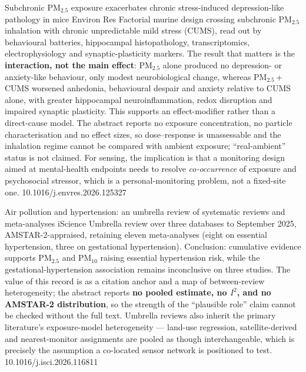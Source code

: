 \documentclass[10pt]{article}
\begin{document}
{Subchronic PM$_{2.5}$ exposure exacerbates chronic stress-induced depression-like pathology in mice}
{Environ Res}
{Factorial murine design crossing subchronic PM$_{2.5}$ inhalation with chronic
unpredictable mild stress (CUMS), read out by behavioural batteries, hippocampal
histopathology, transcriptomics, electrophysiology and synaptic-plasticity markers.
The result that matters is the \textbf{interaction, not the main effect}: PM$_{2.5}$
alone produced no depression- or anxiety-like behaviour, only modest neurobiological
change, whereas PM$_{2.5}$\,+\,CUMS worsened anhedonia, behavioural despair and anxiety
relative to CUMS alone, with greater hippocampal neuroinflammation, redox disruption and
impaired synaptic plasticity. This supports an effect-modifier rather than a direct-cause
model. The abstract reports no exposure concentration, no particle characterisation and no
effect sizes, so dose--response is unassessable and the inhalation regime cannot be
compared with ambient exposure; ``real-ambient'' status is not claimed. For sensing, the
implication is that a monitoring design aimed at mental-health endpoints needs to resolve
\emph{co-occurrence} of exposure and psychosocial stressor, which is a personal-monitoring
problem, not a fixed-site one.}
{10.1016/j.envres.2026.125327}


{Air pollution and hypertension: an umbrella review of systematic reviews and meta-analyses}
{iScience}
{Umbrella review over three databases to September 2025, AMSTAR-2-appraised, retaining
eleven meta-analyses (eight on essential hypertension, three on gestational hypertension).
Conclusion: cumulative evidence supports PM$_{2.5}$ and PM$_{10}$ raising essential
hypertension risk, while the gestational-hypertension association remains inconclusive on
three studies. The value of this record is as a citation anchor and a map of
between-review heterogeneity; the abstract reports \textbf{no pooled estimate, no
$I^2$, and no AMSTAR-2 distribution}, so the strength of the ``plausible role'' claim
cannot be checked without the full text. Umbrella reviews also inherit the primary
literature's exposure-model heterogeneity --- land-use regression, satellite-derived and
nearest-monitor assignments are pooled as though interchangeable, which is precisely the
assumption a co-located sensor network is positioned to test.}
{10.1016/j.isci.2026.116811}
\end{document}
